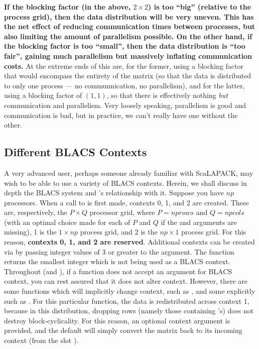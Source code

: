 \np
\textbf{If the blocking factor (in the above, $2\times 2$) is too ``big'' (relative to the process grid), then the data distribution will be very uneven.  This has the net effect of reducing communication times between processes, but also limiting the amount of parallelism possible.  On the other hand, if the blocking factor is too ``small'', then the data distribution is ``too fair'', gaining much parallelism but massively inflating communication costs.}  At the extreme ends of this are, for the former, using a blocking factor that would encompass the entirety of the matrix (so that the data is distributed to only one process --- no communnication, no parallelism), and for the latter, using a blocking factor of $(1,1)$, so that there is effectively nothing \emph{but} communication and parallelism.
\np
Very loosely speaking, parallelism is good and communication is bad, but in practice, we can't really have one without the other.

\subsection[]{Different BLACS Contexts}
\label{sec:ictxt}

A very advanced user, perhaps someone already familiar with ScaLAPACK, may wish to be able to use a variety of BLACS contexts.  Herein, we shall discuss in depth the BLACS system and 's relationship with it.
\np
Suppose you have $np$ processors.  When a call to  is first made, contexts 0, 1, and 2 are created.  These are, respectively, the $P\times Q$ processor grid, where $P=nprows$ and $Q=npcols$ (with an optimal choice made for each of $P$ and $Q$ if the  and  arguments are missing), 1 is the $1\times np$ process grid, and 2 is the $np\times 1$ process grid.  For this reason, \textbf{contexts 0, 1, and 2 are reserved}.  Additional contexts can be created via  by passing integer values of 3 or greater to the  argument.  The function  returns the smallest integer which is not being used as a BLACS context.
\np
Throughout  (and ), if a function does not accept an argument for BLACS context, you can rest assured that it does not alter context.  However, there are some functions which will implicitly change context, such as , and some explicitly such as .  For this particular function, the data is redistributed across context 1, because in this distribution, dropping rows (namely those containing 's) does not destroy block-cyclicality.  For this reason, an optional context argument is provided, and the default will simply convert the matrix back to its incoming context (from the slot ).

